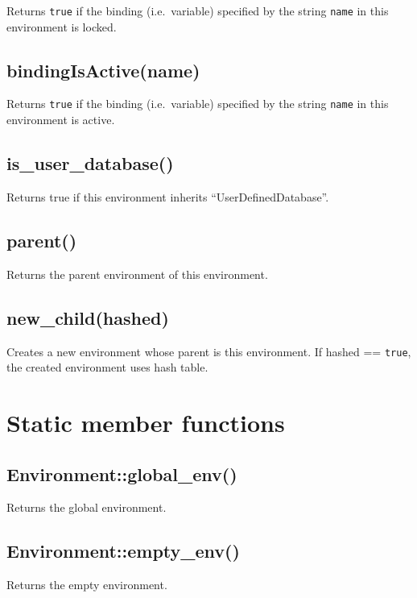 \documentclass[]{book}
\theoremstyle{definition}
\theoremstyle{definition}
\theoremstyle{remark}
\begin{document}
Returns \texttt{true} if the binding (i.e.~variable) specified by the
string \texttt{name} in this environment is locked.

\subsection{bindingIsActive(name)}\label{bindingisactivename}

Returns \texttt{true} if the binding (i.e.~variable) specified by the
string \texttt{name} in this environment is active.

\subsection{is\_user\_database()}\label{is_user_database}

Returns true if this environment inherits ``UserDefinedDatabase''.

\subsection{parent()}\label{parent}

Returns the parent environment of this environment.

\subsection{new\_child(hashed)}\label{new_childhashed}

Creates a new environment whose parent is this environment. If hashed ==
\texttt{true}, the created environment uses hash table.

\section{Static member functions}\label{static-member-functions-2}

\subsection{Environment::global\_env()}\label{environmentglobal_env}

Returns the global environment.

\subsection{Environment::empty\_env()}\label{environmentempty_env}

Returns the empty environment.
\end{document}
